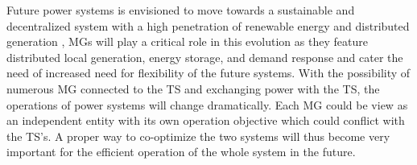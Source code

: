 


Future power systems is envisioned to move towards a sustainable and decentralized system with a high penetration of renewable energy and distributed generation \cite{anderson2017vision}, MGs will play a critical role in this evolution as they feature distributed local generation, energy storage, and demand response and cater the need of increased need for flexibility of the future systems. With the possibility of numerous MG connected to the TS and exchanging power with the TS, the operations of power systems will change dramatically. Each MG could be view as an independent entity with its own operation objective which could conflict with the TS's. A proper way to co-optimize the two systems will thus become very important for the efficient operation of the whole system in the future.


